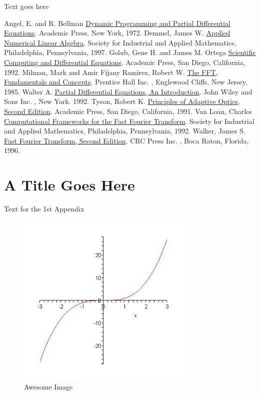 \documentclass[MS, xcolor=dvipsnames]{wfuthesis} %
\begin{document}
Text goes here



\begin{thebibliography}{99}


 Angel, E. and R. Bellman \underline{Dynamic Programming and Partial Differential Equations}.  Academic Press, New York, 1972.
 Demmel, James W. \underline{Applied Numerical Linear Algebra}. Society for Industrial and Applied Mathematics, Philadelphia, Pennsylvania, 1997.
 Golub, Gene H. and James M. Ortega \underline{Scientific Computing and Differential Equations}.  Academic Press, San Diego, California, 1992.
 Milman, Mark and Amir Fijany
 Ramirez, Robert W. \underline{The FFT, Fundamentals and Concepts}. Prentice Hall Inc. , Englewood Cliffs, New Jersey, 1985.
 Walter A. \underline{Partial Differential Equations, An Introduction}.  John Wiley and Sons Inc. , New York. 1992.
 Tyson, Robert K. \underline{Principles of Adaptive Optics, Second Edition}. Academic Press, San Diego, California, 1991.
  Van Loan, Charles \underline{Computational Frameworks for the Fast Fourier Transform}. Society for Industrial and Applied Mathematics, Philadelphia, Pennsylvania, 1992.
  Walker, James S. \underline{Fast Fourier Transform, Second Edition}. CRC Press Inc. , Boca Raton, Florida, 1996.

\end{thebibliography}


\appendix
\chapter{A Title Goes Here}

Text for the 1st Appendix

\begin{figure}[htb]
\begin{center}
\leavevmode
\includegraphics[width=0.75\textwidth]{picture.jpg}
\end{center}
\caption{Awesome Image}
\label{fig:awesome_image}
\end{figure}
\end{document}
